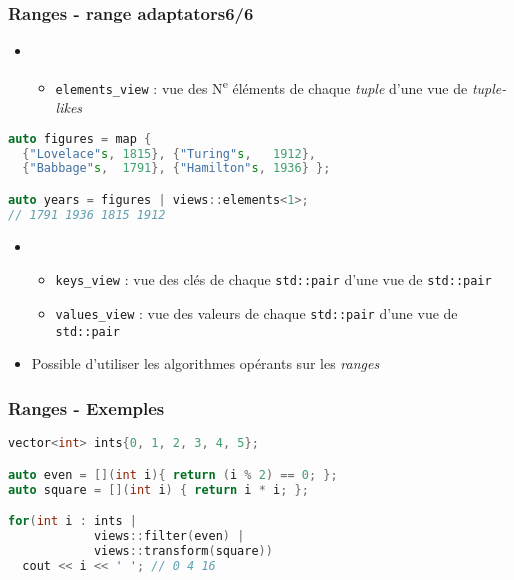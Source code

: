 \documentclass[C++.tex]{subfiles}
\begin{document}
\begin{frame}[fragile]
	\frametitle{Ranges - range adaptators\titlehfill{}6/6}
	\begin{itemize}
		\item  [] \begin{itemize}
			\item \lstinline|elements_view| : vue des N\textsuperscript{e} éléments de chaque \textit{tuple} d'une vue de \textit{tuple-likes}
		\end{itemize}
	\end{itemize}

	\begin{lstlisting}[language=C++]
auto figures = map {
  {"Lovelace"s, 1815}, {"Turing"s,   1912},
  {"Babbage"s,  1791}, {"Hamilton"s, 1936} };

auto years = figures | views::elements<1>;
// 1791 1936 1815 1912\end{lstlisting}

	\begin{itemize}
		\item  [] \begin{itemize}
			\item \lstinline|keys_view| : vue des clés de chaque \lstinline|std::pair| d'une vue de \lstinline|std::pair|
			\item \lstinline|values_view| : vue des valeurs de chaque \lstinline|std::pair| d'une vue de \lstinline|std::pair|
		\end{itemize}
	\item Possible d'utiliser les algorithmes opérants sur les \textit{ranges}
	\end{itemize}
\end{frame}

\begin{frame}[fragile]
	\frametitle{Ranges - Exemples}
	\begin{lstlisting}[language=C++]
vector<int> ints{0, 1, 2, 3, 4, 5};

auto even = [](int i){ return (i % 2) == 0; };
auto square = [](int i) { return i * i; };

for(int i : ints | 
            views::filter(even) | 
            views::transform(square))
  cout << i << ' '; // 0 4 16\end{lstlisting}
\end{frame}
\end{document}
